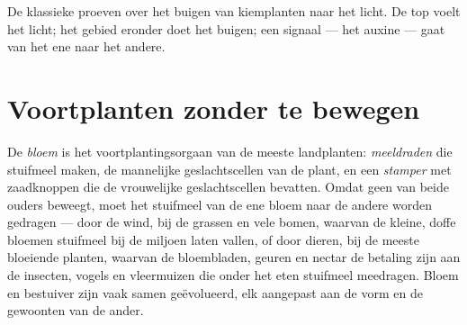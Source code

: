 \begin{omfigure}

{\small De klassieke proeven over het buigen van kiemplanten naar het
licht. De top voelt het licht; het gebied eronder doet het buigen; een
signaal --- het auxine --- gaat van het ene naar het andere.}
\end{omfigure}

\section{Voortplanten zonder te bewegen}

\begin{proposition}\label{prop:g12:plant-rooted-life:flowers}
De \emph{bloem} is het voortplantingsorgaan van de meeste landplanten:
\emph{meeldraden} die stuifmeel maken, de mannelijke geslachtscellen van
de plant, en een \emph{stamper} met zaadknoppen die de vrouwelijke
geslachtscellen bevatten. Omdat geen van beide ouders beweegt, moet het
stuifmeel van de ene bloem naar de andere worden gedragen --- door de
wind, bij de grassen en vele bomen, waarvan de kleine, doffe bloemen
stuifmeel bij de miljoen laten vallen, of door dieren, bij de meeste
bloeiende planten, waarvan de bloembladen, geuren en nectar de betaling
zijn aan de insecten, vogels en vleermuizen die onder het eten stuifmeel
meedragen. Bloem en bestuiver zijn vaak samen geëvolueerd, elk aangepast
aan de vorm en de gewoonten van de ander.
\end{proposition}
\admitted

